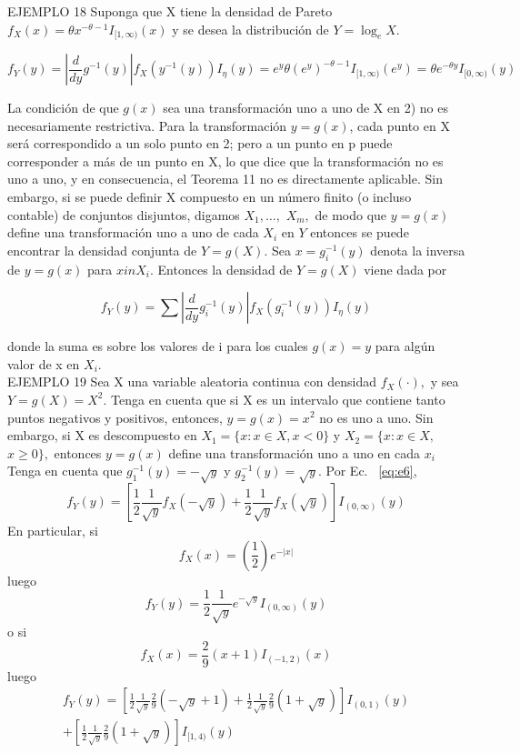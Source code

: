EJEMPLO 18 Suponga que X tiene la densidad de Pareto $f_{X}(x)=\theta x^{-\theta-1} I_{[1, \infty)}(x)$ y se desea la distribución de $Y=\log _{e} X$.
\begin{center}
$$
f_{Y}(y) =\left|\frac{d}{d y} g^{-1}(y)\right| f_{X}\left(y^{-1}(y)\right) I_{\eta}(y)
=e^{y} \theta\left(e^{y}\right)^{-\theta-1} I_{[1, \infty)}\left(e^{y}\right)=\theta e^{-\theta y} I_{[0, \infty)}(y)
$$
\end{center}
La condición de que $g(x)$  sea una transformación uno a uno de X en 2) no es necesariamente restrictiva. Para la transformación $y=g(x)$, cada punto en X será correspondido a un solo punto en 2; pero a un punto en p puede corresponder a más de un punto en X, lo que dice que la transformación no es uno a uno, y en consecuencia, el Teorema 11 no es directamente aplicable. Sin embargo, si se puede definir X compuesto en un número finito (o incluso contable) de conjuntos disjuntos, digamos $X_{1}, \ldots,$ $X_{m},$  de modo que $y=g(x)$  define una transformación uno a uno de cada $X_{i}$ en $Y$ entonces se puede encontrar la densidad conjunta de $Y=g(X)$. Sea $x=g_{i}^{-1}(y)$ denota la inversa de $y=g(x)$ para $x in X_{i} .$ Entonces la densidad de $Y=g(X)$ viene dada por

\begin{equation}\label{eq:e6}
f_{Y}(y)=\sum\left|\frac{d}{d y} g_{i}^{-1}(y)\right| f_{X}\left(g_{i}^{-1}(y)\right) I_{\eta}(y)
\end{equation}

donde la suma es sobre los valores de i para los cuales  $g(x)=y$ para algún valor de x en  $X_{i}$.\\

EJEMPLO 19 Sea X una variable aleatoria continua con densidad $f_{X}(\cdot),$ y sea $Y=g(X)=X^{2} .$  Tenga en cuenta que si X es un intervalo que contiene tanto puntos negativos y positivos, entonces, $y=g(x)=x^{2}$  no es uno a uno. Sin embargo, si X es descompuesto en $X_{1}=\{x: x \in X, x<0\}$ y $X_{2}=\{x: x \in X,$
$x \geq 0\},$ entonces $y=g(x)$ define una transformación uno a uno en cada $x_{i}$ Tenga en cuenta que $g_{1}^{-1}(y)=-\sqrt{y}$ y $g_{2}^{-1}(y)=\sqrt{y} .$ Por Ec. ~\ref{eq:e6},\\
$$
f_{Y}(y)=\left[\frac{1}{2} \frac{1}{\sqrt{y}} f_{X}(-\sqrt{y})+\frac{1}{2} \frac{1}{\sqrt{y}} f_{X}(\sqrt{y})\right] I_{(0, \infty)}(y)
$$
En particular, si
$$
f_{X}(x)=\left(\frac{1}{2}\right) e^{-|x|}
$$
luego
$$
f_{Y}(y)=\frac{1}{2} \frac{1}{\sqrt{y}} e^{-\sqrt{y}} I_{(0, \infty)}(y)
$$
o si
$$
f_{X}(x)=\frac{2}{9}(x+1) I_{(-1,2)}(x)
$$
luego
$$
\begin{aligned}
f_{Y}(y)=\left[\frac{1}{2} \frac{1}{\sqrt{y}} \frac{2}{9}(-\sqrt{y}+1)+\frac{1}{2} \frac{1}{\sqrt{y}} \frac{2}{9}(1+\sqrt{y})\right] I_{(0,1)}(y) \\
+\left[\frac{1}{2} \frac{1}{\sqrt{y}} \frac{2}{9}(1+\sqrt{y})\right] I_{[1,4)}(y)
\end{aligned}
$$

